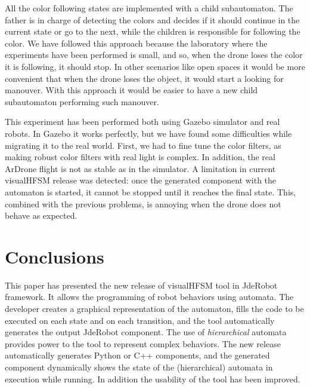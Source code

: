 \documentclass[journal,twoside]{JoPhA}
\begin{document}
All the color following states are implemented with a child subautomaton. The father is in charge of detecting the colors and decides if it should continue in the current state or go to the next, while the children is responsible for following the color. We have followed this approach because the laboratory where the experiments have been performed is small, and so, when the drone loses the color it is following, it should stop. In other scenarios like open spaces it would be more convenient that when the drone loses the object, it would start a looking for manouver. With this approach it would be easier to have a new child subautomaton performing such manouver.

This experiment has been performed both using Gazebo simulator and real robots. In Gazebo it works perfectly, but we have found some difficulties while migrating it to the real world. First, we had to fine tune the color filters, as making robust color filters with real light is complex. In addition, the real ArDrone flight is not as stable as in the simulator. A limitation in current visualHFSM release was detected: once the generated component with the automaton is started, it cannot be stopped until it reaches the final state. This, combined with the previous problems, is annoying when the drone does not behave as expected.

\section{Conclusions}

This paper has presented the new release of visualHFSM tool in JdeRobot framework. It allows the programming of robot behaviors using automata. The developer creates a graphical representation of the automaton, fills the code to be executed on each state and on each transition, and the tool automatically generates the output JdeRobot component. The use of \textit{hierarchical} automata provides power to the tool to represent complex behaviors. The new release automatically generates Python or C++ components, and the generated component dynamically shows the state of the (hierarchical) automata in execution while running. In addition the usability of the tool has been improved.

\end{document}
